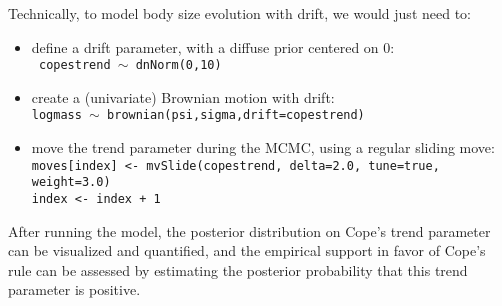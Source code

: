 \documentclass[usletter]{article}
\newcommand{\cmd}[1]{\texttt{#1}}
\begin{document}
Technically, to model body size evolution with drift, we would just need to:
\begin{itemize}
\item
define a drift parameter, with a diffuse prior centered on 0:
\\
\cmd{
copestrend $\sim$ dnNorm(0,10)
}
\item
create a (univariate) Brownian motion with drift:
\\
\cmd{logmass $\sim$ brownian(psi,sigma,drift=copestrend)}
\item
move the trend parameter during the MCMC, using a regular sliding move:
\\
\cmd{moves[index] <- mvSlide(copestrend, delta=2.0, tune=true, weight=3.0)
\\
index <- index + 1}
\end{itemize}
After running the model, the posterior distribution on Cope's trend parameter can be visualized and quantified, and the empirical support in favor of Cope's rule can be assessed by estimating the posterior probability that this trend parameter is positive.





\end{document}

